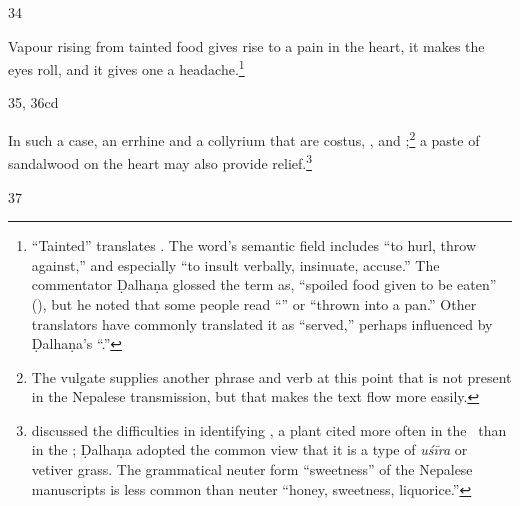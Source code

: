 \begin{translation}
\item[34]

Vapour rising from tainted food gives rise to a pain in the heart,
it makes the eyes roll, and it gives one a headache.\footnote{ “Tainted” translates
.  The word's semantic field includes “to hurl, throw against,” and
especially “to insult verbally, insinuate, accuse.”  The commentator Ḍalhaṇa
glossed the term as, “spoiled food given to be eaten” (), but he noted that some people read “” or
“thrown into a pan.”  Other translators have commonly translated it as “served,” perhaps
influenced by Ḍalhaṇa's “.”}


\item[35, 36cd] 

In such a case, an errhine and a collyrium that are costus, ,  and ;\footnote{The vulgate 
    supplies another phrase and verb at this point that is not present in the Nepalese 
    transmission, but that makes the text flow more easily.}  a paste of sandalwood
on the heart may also provide relief.\footnote{\citet[350]{sing-1972} discussed
the difficulties in identifying , a plant cited more often in the
\SS\ than in the \CS; Ḍalhaṇa adopted the common view that it is a type of \emph{uśīra} or 
vetiver grass.  The grammatical neuter form 
  “sweetness” of the Nepalese
manuscripts is less common than neuter  “honey, sweetness,
liquorice.”}

\item[37]


\end{translation}
